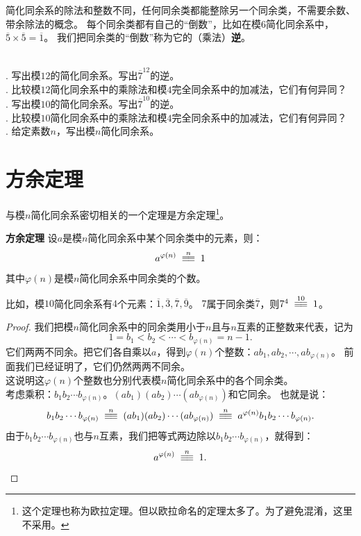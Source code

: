 \documentclass[12pt,UTF8]{ctexbook}
\begin{document}
简化同余系的除法和整数不同，任何同余类都能整除另一个同余类，不需要余数、带余除法的概念。
每个同余类都有自己的“倒数”，比如在模$6$简化同余系中，$\overline{5}\times\overline{5} = \overline{1}$。
我们把同余类的“倒数”称为它的（乘法）\textbf{逆}。

\begin{xt}
    \mbox{}\\
    . 写出模$12$的简化同余系。写出$\overline{7}^{12}$的逆。\\
    . 比较模$12$简化同余系中的乘除法和模$4$完全同余系中的加减法，它们有何异同？\\
    . 写出模$10$的简化同余系。写出$\overline{7}^{10}$的逆。\\
    . 比较模$10$简化同余系中的乘除法和模$4$完全同余系中的加减法，它们有何异同？\\
    . 给定素数$n$，写出模$n$简化同余系。
\end{xt}

\section{方余定理}
与模$n$简化同余系密切相关的一个定理是方余定理\footnote{这个定理也称为欧拉定理。但以欧拉命名的定理太多了。为了避免混淆，这里不采用。}。
\begin{tm}{\textbf{方余定理} }\label{tm:3-3-0}
    设$a$是模$n$简化同余系中某个同余类中的元素，则：
    $$ a^{\varphi(n)} \tong{n} 1 $$
    其中$\varphi(n)$是模$n$简化同余系中同余类的个数。
\end{tm}
比如，模$10$简化同余系有$4$个元素：$\overline{1}, \overline{3},\overline{7},\overline{9}$。
$7$属于同余类$\overline{7}$，则$7^4 \tong{10} 1$。

\begin{proof}
    我们把模$n$简化同余系中的同余类用小于$n$且与$n$互素的正整数来代表，记为
    $$1 = b_1 < b_2 < \cdots < b_{\varphi(n)} = n-1.$$
    它们两两不同余。把它们各自乘以$a$，得到$\varphi(n)$个整数：$ab_1, ab_2, \cdots , ab_{\varphi(n)}$。
    前面我们已经证明了，它们仍然两两不同余。\\
    这说明这$\varphi(n)$个整数也分别代表模$n$简化同余系中的各个同余类。\\
    考虑乘积：$b_1 b_2 \cdots b_{\varphi(n)}$。$(ab_1) (ab_2) \cdots (ab_{\varphi(n)})$和它同余。
    也就是说：
    $$b_1 b_2 \cdots b_{\varphi(n)} \tong{n} (ab_1) (ab_2) \cdots (ab_{\varphi(n)}) \tong{n} a^{\varphi(n)} b_1 b_2 \cdots b_{\varphi(n)}.$$
    由于$b_1 b_2 \cdots b_{\varphi(n)}$也与$n$互素，我们把等式两边除以$b_1 b_2 \cdots b_{\varphi(n)}$，就得到：
    $$ a^{\varphi(n)} \tong{n} 1 . $$
\end{proof}
\end{document}
